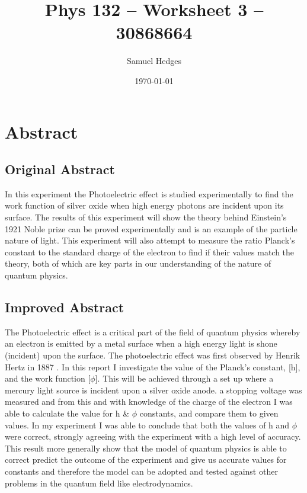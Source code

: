 \documentclass[12pt]{article}
\begin{document}
    \title{Phys 132 -- Worksheet 3 -- 30868664}
    \author{Samuel Hedges}
    \date{\today}
    \maketitle
    
\section{Abstract}
    \subsection{Original Abstract}
 In this experiment the Photoelectric effect is studied experimentally to find the work function of silver oxide when high energy photons are incident upon its surface. The results of this experiment will show the theory behind Einstein’s 1921 Noble prize \cite{1921 Nobel} can be proved experimentally and is an example of the particle nature of light. This experiment will also attempt to measure the ratio Planck’s constant to the standard charge of the electron to find if their values match the theory, both of which are key parts in our understanding of the nature of quantum physics.\\

    \subsection{Improved Abstract}
The Photoelectric effect is a critical part of the field of quantum physics whereby an electron is emitted by a metal surface when a high energy light is shone (incident) upon the surface. The photoelectric effect was first observed by Henrik Hertz in 1887 \cite{Hertz}. In this report I  investigate the value of the Planck's constant, [h], and the work function [$\phi$]. This will be achieved through a set up where a mercury light source is incident upon a silver oxide anode. a stopping voltage was measured and from this and with knowledge of the charge of the electron I was able to calculate the value for h \& $\phi$ constants, and compare them to given values. In my experiment I was able to conclude that both the values of h and $\phi$ were correct, strongly agreeing with the experiment with a high level of accuracy. This result more generally show that the model of quantum physics is able to correct predict the outcome of the experiment and give us accurate values for constants and therefore the model can be adopted and tested against other problems in the quantum field like electrodynamics.\\
\end{document}
